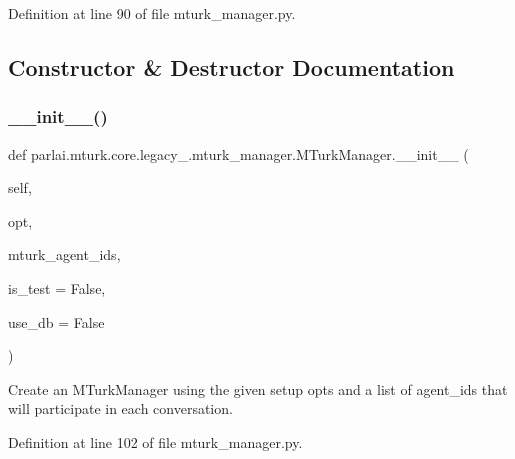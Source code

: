 Definition at line 90 of file mturk\+\_\+manager.\+py.



\subsection{Constructor \& Destructor Documentation}
\mbox{\label{classparlai_1_1mturk_1_1core_1_1legacy__2018_1_1mturk__manager_1_1MTurkManager_a2d08f60b481cccbf13b6da5625fa0ea7}} 
\subsubsection{\texorpdfstring{\+\_\+\+\_\+init\+\_\+\+\_\+()}{\_\_init\_\_()}}
{\footnotesize\ttfamily def parlai.\+mturk.\+core.\+legacy\+\_.\+mturk\+\_\+manager.\+M\+Turk\+Manager.\+\_\+\+\_\+init\+\_\+\+\_\+ (\begin{DoxyParamCaption}\item[{}]{self,  }\item[{}]{opt,  }\item[{}]{mturk\+\_\+agent\+\_\+ids,  }\item[{}]{is\+\_\+test = {\ttfamily False},  }\item[{}]{use\+\_\+db = {\ttfamily False} }\end{DoxyParamCaption})}

\begin{DoxyVerb}Create an MTurkManager using the given setup opts and a list of agent_ids that
will participate in each conversation.
\end{DoxyVerb}
 

Definition at line 102 of file mturk\+\_\+manager.\+py.


